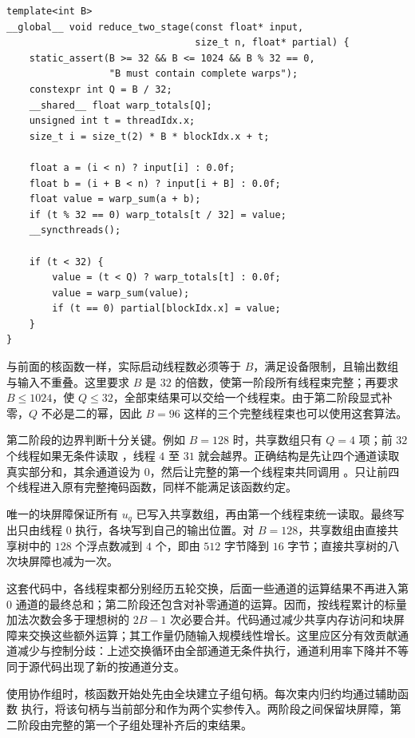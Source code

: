 \noindent\begin{minipage}{\linewidth}
\begin{lstlisting}[caption={两阶段线程束归约：一个块屏障与正确的第二阶段补零},label={l15:lst:code10}]
template<int B>
__global__ void reduce_two_stage(const float* input,
                                 size_t n, float* partial) {
    static_assert(B >= 32 && B <= 1024 && B % 32 == 0,
                  "B must contain complete warps");
    constexpr int Q = B / 32;
    __shared__ float warp_totals[Q];
    unsigned int t = threadIdx.x;
    size_t i = size_t(2) * B * blockIdx.x + t;

    float a = (i < n) ? input[i] : 0.0f;
    float b = (i + B < n) ? input[i + B] : 0.0f;
    float value = warp_sum(a + b);
    if (t % 32 == 0) warp_totals[t / 32] = value;
    __syncthreads();

    if (t < 32) {
        value = (t < Q) ? warp_totals[t] : 0.0f;
        value = warp_sum(value);
        if (t == 0) partial[blockIdx.x] = value;
    }
}
\end{lstlisting}
\end{minipage}

与前面的核函数一样，实际启动线程数必须等于 $B$，满足设备限制，且输出数组与输入不重叠。这里要求 $B$ 是 $32$ 的倍数，使第一阶段所有线程束完整；再要求 $B\leq1024$，使 $Q\leq32$，全部束结果可以交给一个线程束。由于第二阶段显式补零，$Q$ 不必是二的幂，因此 $B=96$ 这样的三个完整线程束也可以使用这套算法。

第二阶段的边界判断十分关键。例如 $B=128$ 时，共享数组只有 $Q=4$ 项；前 $32$ 个线程如果无条件读取 \mbox{}，线程 $4$ 至 $31$ 就会越界。正确结构是先让四个通道读取真实部分和，其余通道设为 $0$，然后让完整的第一个线程束共同调用 \mbox{}。只让前四个线程进入原有完整掩码函数，同样不能满足该函数约定。

唯一的块屏障保证所有 $u_q$ 已写入共享数组，再由第一个线程束统一读取。最终写出只由线程 $0$ 执行，各块写到自己的输出位置。对 $B=128$，共享数组由直接共享树中的 $128$ 个浮点数减到 $4$ 个，即由 $512$ 字节降到 $16$ 字节；直接共享树的八次块屏障也减为一次。

这套代码中，各线程束都分别经历五轮交换，后面一些通道的运算结果不再进入第 $0$ 通道的最终总和；第二阶段还包含对补零通道的运算。因而，按线程累计的标量加法次数会多于理想树的 $2B-1$ 次必要合并。代码通过减少共享内存访问和块屏障来交换这些额外运算；其工作量仍随输入规模线性增长。这里应区分有效贡献通道减少与控制分歧：上述交换循环由全部通道无条件执行，通道利用率下降并不等同于源代码出现了新的按通道分支。

使用协作组时，核函数开始处先由全块建立子组句柄。每次束内归约均通过辅助函数 \mbox{} 执行，将该句柄与当前部分和作为两个实参传入。两阶段之间保留块屏障，第二阶段由完整的第一个子组处理补齐后的束结果。
